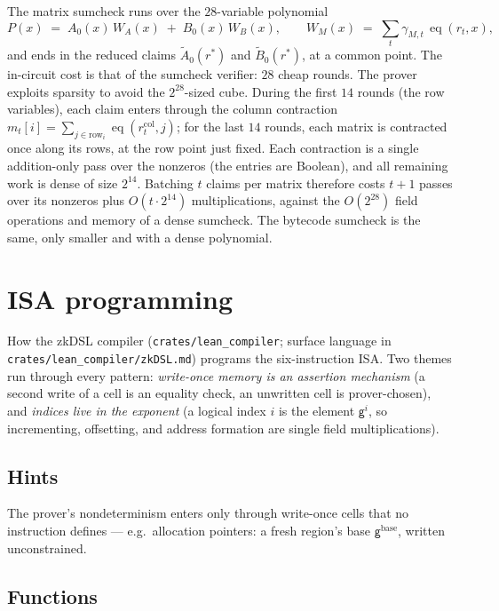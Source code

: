 \documentclass[11pt]{article}
\newcommand{\eq}{\operatorname{eq}}
\newcommand{\gen}{\mathsf{g}}
\begin{document}
The matrix sumcheck runs over the $28$-variable polynomial
\[
  P(x) \;=\; A_0(x)\,W_A(x) \;+\; B_0(x)\,W_B(x),
  \qquad
  W_M(x) \;=\; \textstyle\sum_t \gamma_{M,t}\,\eq(r_t,x),
\]
and ends in the reduced claims $\widetilde A_0(r^\ast)$ and $\widetilde B_0(r^\ast)$, at a common point. The in-circuit cost is that of the sumcheck verifier: $28$ cheap rounds. The prover exploits sparsity to avoid the $2^{28}$-sized cube. During the first $14$ rounds (the row variables), each claim enters through the column contraction $m_t[i]=\sum_{j\in\mathrm{row}_i}\eq(r_t^{\mathrm{col}},j)$; for the last $14$ rounds, each matrix is contracted once along its rows, at the row point just fixed. Each contraction is a single addition-only pass over the nonzeros (the entries are Boolean), and all remaining work is dense of size $2^{14}$. Batching $t$ claims per matrix therefore costs $t+1$ passes over its nonzeros plus $O(t\cdot2^{14})$ multiplications, against the $O(2^{28})$ field operations and memory of a dense sumcheck. The bytecode sumcheck is the same, only smaller and with a dense polynomial.

\section{ISA programming}\label{sec:isa-programming}

How the zkDSL compiler (\texttt{crates/lean\_compiler}; surface language in \texttt{crates/lean\_compiler/zkDSL.md}) programs the six-instruction ISA. Two themes run through every pattern: \emph{write-once memory is an assertion mechanism} (a second write of a cell is an equality check, an unwritten cell is prover-chosen), and \emph{indices live in the exponent} (a logical index $i$ is the element $\gen^{i}$, so incrementing, offsetting, and address formation are single field multiplications).

\subsection{Hints}\label{sec:prog-hints}

The prover's nondeterminism enters only through write-once cells that no instruction defines — e.g.\ allocation pointers: a fresh region's base $\gen^{\mathrm{base}}$, written unconstrained.

\subsection{Functions}\label{sec:prog-functions}
\end{document}
